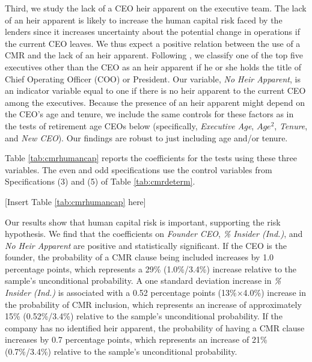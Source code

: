 \documentclass[a4paper,12pt]{article}
\begin{document}
Third, we study the lack of a CEO heir apparent on the executive team.
The lack of an heir apparent is likely to increase the human capital risk faced by the lenders since it increases uncertainty about the potential change in operations if the current CEO leaves.
We thus expect a positive relation between the use of a CMR and the lack of an heir apparent.
Following \cite{Fee_2003}, we classify one of the top five executives other than the CEO as an heir apparent if he or she holds the title of Chief Operating Officer (COO) or President.
Our variable, \textit{No Heir Apparent}, is an indicator variable equal to one if there is no heir apparent to the current CEO among the executives.
Because the presence of an heir apparent might depend on the CEO's age and tenure, we include the same controls for these factors as in the tests of retirement age CEOs below (specifically, \textit{Executive Age}, $Age^2$, \textit{Tenure}, and \textit{New CEO}). 
Our findings are robust to just including age and/or tenure.



Table \ref{tab:cmrhumancap} reports the coefficients for the tests using these three variables.
The even and odd specifications use the control variables from Specifications (3) and (5) of Table \ref{tab:cmrdeterm}.


\begin{center}
    [Insert Table \ref{tab:cmrhumancap} here]
\end{center}

Our results show that human capital risk is important, supporting the risk hypothesis.
We find that the coefficients on \textit{Founder CEO}, \textit{\% Insider (Ind.)}, and \textit{No Heir Apparent} are positive and statistically significant.
If the CEO is the founder, the probability of a CMR clause being included increases by 1.0 percentage points, which represents a 29\% (1.0\%/3.4\%) increase relative to the sample's unconditional probability.
A one standard deviation increase in \textit{\% Insider (Ind.)} is associated with a 0.52 percentage points (13\%$\times$4.0\%) increase in the probability of CMR inclusion, which represents an increase of approximately 15\% (0.52\%/3.4\%) relative to the sample's unconditional probability.
If the company has no identified heir apparent, the probability of having a CMR clause increases by 0.7 percentage points, which represents an increase of 21\% (0.7\%/3.4\%) relative to the sample's unconditional probability.
\end{document}
